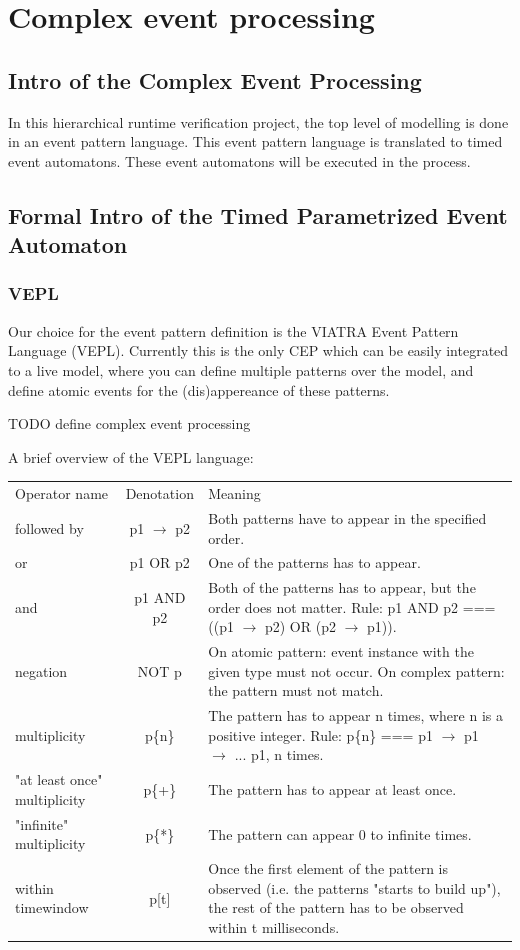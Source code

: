 \chapter{Complex event processing}
	\label{chap:cep}
	\section{Intro of the Complex Event Processing}
		In this hierarchical runtime verification project, the top level of modelling is done in an event pattern language.
		This event pattern language is translated to timed event automatons. These event automatons will be executed in the
		process.
	\section{Formal Intro of the Timed Parametrized Event Automaton}
		\subsection{VEPL}
			Our choice for the event pattern definition is the VIATRA Event Pattern Language (VEPL).
			Currently this is the only CEP which can be easily integrated to a live model, where 
			you can define multiple patterns over the model, and define atomic events for the (dis)appereance
			of these patterns.
			
			TODO define complex event processing
			
			A brief overview of the VEPL language:

\begin{tabular}{lcm{6cm}}
\centering
Operator name &	Denotation & Meaning \\
followed by & p1 $\rightarrow$ p2 & Both patterns have to appear in the specified order. \\
or &	p1 OR p2 &	One of the patterns has to appear. \\
and &	p1 AND p2 &	Both of the patterns has to appear, but the order does not matter. Rule: p1 AND p2 === ((p1 $\rightarrow$ p2) OR (p2 $\rightarrow$ p1)). \\
negation &	NOT p &	On atomic pattern: event instance with the given type must not occur. On complex pattern: the pattern must not match. \\
multiplicity &	p\{n\} &	The pattern has to appear n times, where n is a positive integer. Rule: p\{n\} === p1 $\rightarrow$ p1 $\rightarrow$ ... p1, n times. \\
"at least once" multiplicity &	p\{+\} &	The pattern has to appear at least once. \\
"infinite" multiplicity &	p\{*\} &	The pattern can appear 0 to infinite times. \\
within timewindow &	p[t] &	Once the first element of the pattern is observed (i.e. the patterns "starts to build up"), the rest of the pattern has to be observed within t milliseconds.
\end{tabular}	
			
